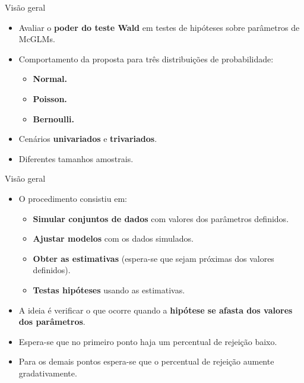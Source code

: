 \documentclass[
  ignorenonframetext,
  serif,
  professionalfont,
  usenames,
  dvipsnames,
  aspectratio = 169]{beamer}
\begin{document}
\begin{frame}{Visão geral}
\protect\hypertarget{visuxe3o-geral}{}
\begin{itemize}
  \itemsep 2ex
    
  \item Avaliar o \textbf{poder do teste Wald} em testes de hipóteses sobre parâmetros de McGLMs. 

  \item Comportamento da proposta para três distribuições de probabilidade: 
    \begin{itemize}
      \item \textbf{Normal.}
        \item \textbf{Poisson.}
        \item \textbf{Bernoulli.}
    \end{itemize}
    
  \item Cenários \textbf{univariados} e \textbf{trivariados}.

  \item Diferentes tamanhos amostrais.
\end{itemize}
\end{frame}

\begin{frame}{Visão geral}
\protect\hypertarget{visuxe3o-geral-1}{}
\begin{itemize}
  \itemsep 2ex
    
  \item O procedimento consistiu em:
    \begin{itemize}
      \item \textbf{Simular conjuntos de dados} com valores dos parâmetros definidos.
    \item \textbf{Ajustar modelos} com os dados simulados.
    \item \textbf{Obter as estimativas} (espera-se que sejam próximas dos valores definidos).
      \item \textbf{Testas hipóteses} usando as estimativas.
    \end{itemize}

  \item A ideia é verificar o que ocorre quando a \textbf{hipótese se afasta dos valores dos parâmetros}. 

  \item Espera-se que no primeiro ponto haja um percentual de rejeição baixo. 

  \item Para os demais pontos espera-se que o percentual de rejeição aumente gradativamente.
  
\end{itemize}
\end{frame}
\end{document}
